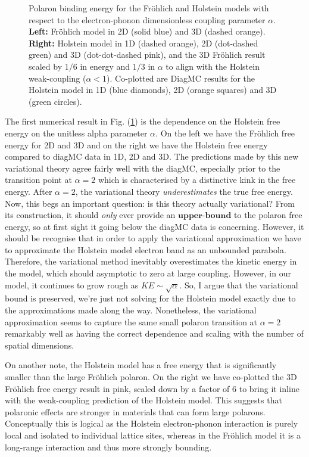 \begin{figure}
\begin{subfigure}[b]{0.49\textwidth}
  \end{subfigure}
  \caption{Polaron binding energy for the Fr\"ohlich and Holstein models with respect to the electron-phonon dimensionless coupling parameter $\alpha$. \textbf{Left:} Fr\"ohlich model in 2D (solid blue) and 3D (dashed orange). \textbf{Right:} Holstein model in 1D (dashed orange), 2D (dot-dashed green) and 3D (dot-dot-dashed pink), and the 3D Fr\"ohlich result scaled by $1/6$ in energy and $1/3$ in $\alpha$ to align with the Holstein weak-coupling ($\alpha < 1$). Co-plotted are DiagMC results for the Holstein model in 1D (blue diamonds), 2D (orange squares) and 3D (green circles).}
  \label{fig:energy_alpha}
\end{figure}

The first numerical result in Fig. (\ref{fig:energy_alpha}) is the dependence on the Holstein free energy on the unitless alpha parameter $\alpha$. On the left we have the Fr\"ohlich free energy for 2D and 3D and on the right we have the Holstein free energy compared to diagMC data in 1D, 2D and 3D. The predictions made by this new variational theory agree fairly well with the diagMC, especially prior to the transition point at $\alpha = 2$ which is characterised by a distinctive kink in the free energy. After $\alpha = 2$, the variational theory \emph{underestimates} the true free energy. Now, this begs an important question: is this theory actually variational? From its construction, it should \emph{only} ever provide an $\textbf{upper-bound}$ to the polaron free energy, so at first sight it going below the diagMC data is concerning. However, it should be recognise that in order to apply the variational approximation we have to approximate the Holstein model electron band as an unbounded parabola. Therefore, the variational method inevitably overestimates the kinetic energy in the model, which should asymptotic to zero at large coupling. However, in our model, it continues to grow rough as $KE \sim \sqrt{\alpha}$. So, I argue that the variational bound is preserved, we're just not solving for the Holstein model exactly due to the approximations made along the way. Nonetheless, the variational approximation seems to capture the same small polaron transition at $\alpha = 2$ remarkably well as having the correct dependence and scaling with the number of spatial dimensions.
\newline

On another note, the Holstein model has a free energy that is significantly smaller than the large Fr\"ohlich polaron. On the right we have co-plotted the 3D Fr\"ohlich free energy result in pink, scaled down by a factor of $6$ to bring it inline with the weak-coupling prediction of the Holstein model. This suggests that polaronic effects are stronger in materials that can form large polarons. Conceptually this is logical as the Holstein electron-phonon interaction is purely local and isolated to individual lattice sites, whereas in the Fr\"ohlich model it is a long-range interaction and thus more strongly bounding.

